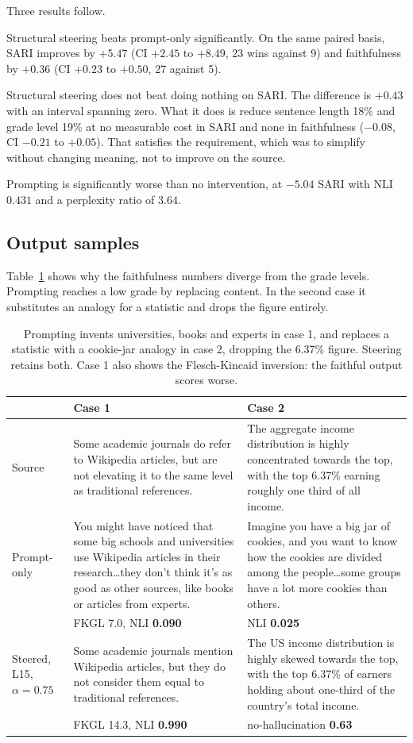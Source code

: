 \documentclass[twocolumn,10pt,a4paper]{article}
\begin{document}
Three results follow.

Structural steering beats prompt-only significantly. On the same paired basis,
SARI improves by $+5.47$ (CI $+2.45$ to $+8.49$, 23 wins against 9) and
faithfulness by $+0.36$ (CI $+0.23$ to $+0.50$, 27 against 5).

Structural steering does not beat doing nothing on SARI. The difference is
$+0.43$ with an interval spanning zero. What it does is reduce sentence length
18\% and grade level 19\% at no measurable cost in SARI and none in faithfulness
($-0.08$, CI $-0.21$ to $+0.05$). That satisfies the requirement, which was to
simplify without changing meaning, not to improve on the source.

Prompting is significantly worse than no intervention, at $-5.04$ SARI with NLI
$0.431$ and a perplexity ratio of $3.64$.

\subsection{Output samples}

Table~\ref{tab:qual} shows why the faithfulness numbers diverge from the grade
levels. Prompting reaches a low grade by replacing content. In the second case it
substitutes an analogy for a statistic and drops the figure entirely.

\begin{table}[t]
\centering
\small
\begin{tabular}{p{2.0cm}p{6.4cm}p{6.4cm}}
\toprule
& Case 1 & Case 2 \\
\midrule
Source &
Some academic journals do refer to Wikipedia articles, but are not elevating it
to the same level as traditional references. &
The aggregate income distribution is highly concentrated towards the top, with
the top 6.37\% earning roughly one third of all income. \\
\addlinespace
Prompt-only &
You might have noticed that some big schools and universities use Wikipedia
articles in their research\dots they don't think it's as good as other sources,
like books or articles from experts. &
Imagine you have a big jar of cookies, and you want to know how the cookies are
divided among the people\dots some groups have a lot more cookies than others. \\
& FKGL 7.0, NLI \textbf{0.090} & NLI \textbf{0.025} \\
\addlinespace
Steered, L15, $\alpha{=}0.75$ &
Some academic journals mention Wikipedia articles, but they do not consider them
equal to traditional references. &
The US income distribution is highly skewed towards the top, with the top 6.37\%
of earners holding about one-third of the country's total income. \\
& FKGL 14.3, NLI \textbf{0.990} & no-hallucination \textbf{0.63} \\
\bottomrule
\end{tabular}
\caption{Prompting invents universities, books and experts in case 1, and
replaces a statistic with a cookie-jar analogy in case 2, dropping the 6.37\%
figure. Steering retains both. Case 1 also shows the Flesch-Kincaid inversion:
the faithful output scores worse.}
\label{tab:qual}
\end{table}
\end{document}
